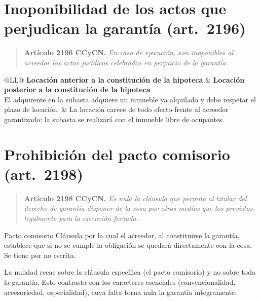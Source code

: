 \documentclass[12pt,oneside]{book}
\begin{document}
\section{Inoponibilidad de los actos que perjudican la garantía (art.~2196)}

\begin{quote}
\textbf{Artículo 2196 CCyCN.} \textit{En caso de ejecución, son inoponibles al acreedor los actos jurídicos celebrados en perjuicio de la garantía.}
\end{quote}

\begin{table}[H]
\centering
\begin{tabularx}{\textwidth}{@{}LL@{}}
\toprule
\textbf{Locación anterior a la constitución de la hipoteca} & \textbf{Locación posterior a la constitución de la hipoteca} \\
\midrule
El adquirente en la subasta adquiere un inmueble ya alquilado y debe respetar el plazo de locación. & La locación carece de todo efecto frente al acreedor garantizado; la subasta se realizará con el inmueble libre de ocupantes. \\
\bottomrule
\end{tabularx}
\end{table}

\section{Prohibición del pacto comisorio (art.~2198)}

\begin{quote}
\textbf{Artículo 2198 CCyCN.} \textit{Es nula la cláusula que permite al titular del derecho de garantía disponer de la cosa por otros medios que los previstos legalmente para la ejecución forzada.}
\end{quote}

\begin{definition}{Pacto comisorio}
Cláusula por la cual el acreedor, al constituirse la garantía, establece que si no se cumple la obligación se quedará directamente con la cosa. Se tiene por no escrita.
\end{definition}

\begin{important}
La nulidad recae sobre la cláusula específica (el pacto comisorio) y no sobre toda la garantía. Esto contrasta con los caracteres esenciales (convencionalidad, accesoriedad, especialidad), cuya falta torna nula la garantía íntegramente.
\end{important}
\end{document}
